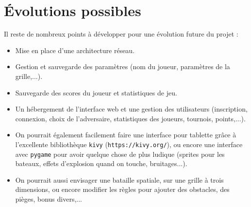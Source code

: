 \section{Évolutions possibles}
Il reste de nombreux points à développer pour une évolution future du projet :
\begin{itemize}
\item Mise en place d'une architecture réseau.
\item Gestion et sauvegarde des paramètres (nom du joueur, paramètres de la grille,...).
\item Sauvegarde des scores du joueur et statistiques de jeu.
\item Un hébergement de l'interface web et une gestion des utilisateurs (inscription, connexion, choix de l'adversaire, statistiques des joueurs, tournois, points,...).
\item On pourrait également facilement faire une interface pour tablette grâce à l'excellente bibliothèque \texttt{kivy} (\texttt{https://kivy.org/}), ou encore une interface avec \texttt{pygame} pour avoir quelque chose de plus ludique (sprites pour les bateaux, effets d'explosion quand on touche, bruitages...).
\item On pourrait aussi envisager une bataille spatiale, sur une grille à trois dimensions, ou encore modifier les règles pour ajouter des obstacles, des pièges, bonus divers,...
\end{itemize}





%
%

